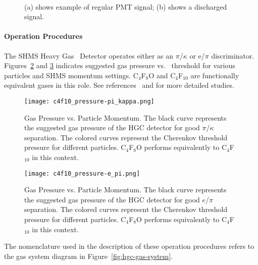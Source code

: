 {\begin{figure}
     \centering
     ~
     \caption{(a) shows example of regular PMT signal; (b) shows a discharged signal.}
     \label{hgc:signal}
\end{figure}

%
%
%

\paragraph{Operation Procedures}
%
The SHMS Heavy Gas \Cerenkov\ Detector operates either as an $\pi$/$\kappa$ or
e/$\pi$ discriminator.  Figures~\ref{fig:c4f10-pressure-pi-kappa} and
\ref{fig:c4f10-pressure-e-pi} indicates suggested gas pressure vs. \Cerenkov\
threshold for various particles and SHMS momentum settings.  C$_4$F$_8$O and
C$_4$F$_{10}$ are functionally equivalent gases in this role.
See references~ \cite{docdb:SHMS-HGC-pi-kappa-docs} and \cite{docdb:SHMS-HGC-e-pi-docs}
for more detailed studies.

\begin{figure}
\centering
\texttt{[image: c4f10\_pressure-pi\_kappa.png]}
\caption{Gas Pressure vs. Particle Momentum. The black curve represents the
  suggested gas pressure of the HGC detector for good $\pi$/$\kappa$
  separation.  The colored curves represent the Cherenkov threshold pressure
  for different particles.  C$_4$F$_8$O performs equivalently to C$_4$F$_{10}$ in this
  context.
}
\label{fig:c4f10-pressure-pi-kappa}
\end{figure}

\begin{figure}
\centering
\texttt{[image: c4f10\_pressure-e\_pi.png]}
\caption{Gas Pressure vs. Particle Momentum. The black curve represents the
  suggested gas pressure of the HGC detector for good $e$/$\pi$
  separation. The colored curves represent the Cherenkov threshold pressure
  for different particles.  C$_4$F$_8$O performs equivalently to C$_4$F$_{10}$ in this context.
}
\label{fig:c4f10-pressure-e-pi}
\end{figure}

The nomenclature used in the description of these operation procedures refers
to the gas system diagram in Figure~\ref{fig:hgc-gas-system}.

}
